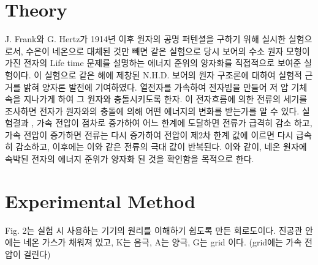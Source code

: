 \documentclass[a4paper, 10pt, nanum]{CSUniSchoolLabReport}
\begin{document}
\section{Theory}


  J. Frank와 G. Hertz가 1914년 이후 원자의 공명 퍼텐셜을 구하기 위해 실시한 실험으로서, 수은이 네온으로 대체된 것만 빼면 같은 실험으로 당시 보어의 수소 원자 모형이 가진 전자의 Life time 문제를 설명하는 에너지 준위의 양자화를 직접적으로 보여준 실험이다. 이 실험으로 같은 해에 제창된 N.H.D. 보어의 원자 구조론에 대하여 실험적 근거를 밝혀 양자론 발전에 기여하였다. 열전자를 가속하여 전자빔을 만들어 저
  압 기체 속을 지나가게 하여 그 원자와 충돌시키도록 한자. 이 전자흐름에 의한 전류의 세기를 조사하면 전자가 원자와의 충돌에 의해 어떤 에너지의 변화를 받는가를 알 수 있다. 실험결과 , 가속 전압이 점차로 증가하여 어느 한계에 도달하면 전류가 급격히 감소
  하고, 가속 전압이 증가하면 전류는 다시 증가하여 전압이 제2차 한계 값에 이르면 다시 급속히 감소하고, 이후에는 이와 같은 전류의 극대 값이 반복된다. 이와 같이, 네온 원자에 속박된 전자의 에너지 준위가 양자화 된 것을 확인함을 목적으로 한다.


\section{Experimental Method}


	Fig. 2는 실험 시 사용하는 기기의 원리를 이해하기 쉽도록 만든 회로도이다. 진공관 안에는 네온 가스가 채워져 있고, K는 음극, A는 양극, G는 grid 이다. (grid에는 가속 전압이 걸린다)
\end{document}
